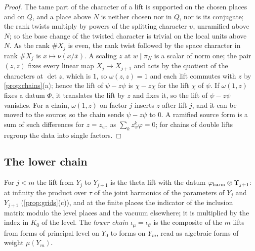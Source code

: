 \begin{proof}
The tame part of the character of a lift is supported on the chosen places and on $Q$, and a place above $N$ is neither chosen nor in $Q$, nor is its conjugate; the rank twists multiply by powers of the splitting character $\upsilon$, unramified above $N$; so the base change of the twisted character is trivial on the local units above $N$. As the rank
$\#X_j$ is even, the rank twist followed by the space character in rank $\#X_j$ is $x\mapsto\nu(x/\bar x)$. A scaling $z$ at $w\mid\pi_N$ is a scalar of norm one; the pair $(z,z)$ fixes every linear map $X_j\to X_{j+1}$ and acts by the quotient of the characters at $\det z$, which is $1$, so $\omega(z,z)=1$ and each lift commutes with
$z$ by \cref{prop:chains}(a); hence the lift of $\psi-z\psi$ is $\chi-z\chi$ for the lift $\chi$ of $\psi$. If $\omega(1,z)$ fixes a datum $\Phi$, it translates the lift by $z$ and fixes it, so the lift of $\psi-z\psi$ vanishes. For a chain, $\omega(1,z)$ on factor $j$ inserts $z$ after lift $j$, and it can be moved to the source; so the chain
sends $\psi-z\psi$ to $0$. A ramified source form is a sum of such differences for $z=z_w$, as $\sum_kz_w^k\varphi=0$; for chains of double lifts regroup the data into single factors.
\end{proof}

\subsection{The lower chain}\label{ss:lower-chain}
For $j<m$ the lift from $Y_j$ to $Y_{j+1}$ is the theta lift with the datum $\varphi_{\rm harm}\otimes\Upsilon_{j+1}$: at
infinity the product over $\tau$ of the joint harmonics of the parameters of $Y_j$ and $Y_{j+1}$
(\cref{prop:grids}(c)), and at the finite places the indicator of the inclusion matrix modulo the level places and
the vacuum elsewhere; it is multiplied by the index in $K_0$ of the level. The \emph{lower chain}
$\iota_\mu=\iota_{\vartheta}$ is the composite of the $m$ lifts from forms of principal level on $Y_0$ to forms on $Y_m$,
read as algebraic forms of weight $\mu(Y_m)$.

